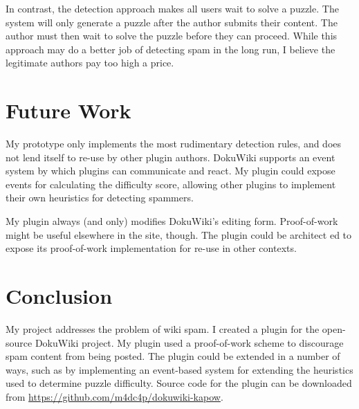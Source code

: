 \documentclass[12pt]{article}
\newcounter{rules}
\begin{document}
In contrast, the detection approach makes all users wait to solve a
puzzle. The system will only generate a puzzle after the author
submits their content. The author must then wait to solve the puzzle
before they can proceed. While this approach may do a better job of
detecting spam in the long run, I believe the legitimate authors pay
too high a price.

\section*{Future Work}

My prototype only implements the most rudimentary detection rules, and
does not lend itself to re-use by other plugin authors. DokuWiki
supports an event system by which plugins can communicate and
react. My plugin could expose events for calculating the difficulty
score, allowing other plugins to implement their own heuristics for
detecting spammers. 

My plugin always (and only) modifies DokuWiki's editing
form. Proof-of-work might be useful elsewhere in the site, though. The
plugin could be architect ed to expose its proof-of-work
implementation for re-use in other contexts.

\section*{Conclusion}
My project addresses the problem of wiki spam. I created a plugin for
the open-source DokuWiki project. My plugin used a proof-of-work
scheme to discourage spam content from being posted. The plugin could be
extended in a number of ways, such as by implementing an event-based
system for extending the heuristics used to determine puzzle
difficulty. Source code for the plugin can be downloaded from
\url{https://github.com/m4dc4p/dokuwiki-kapow}.
\end{document}
